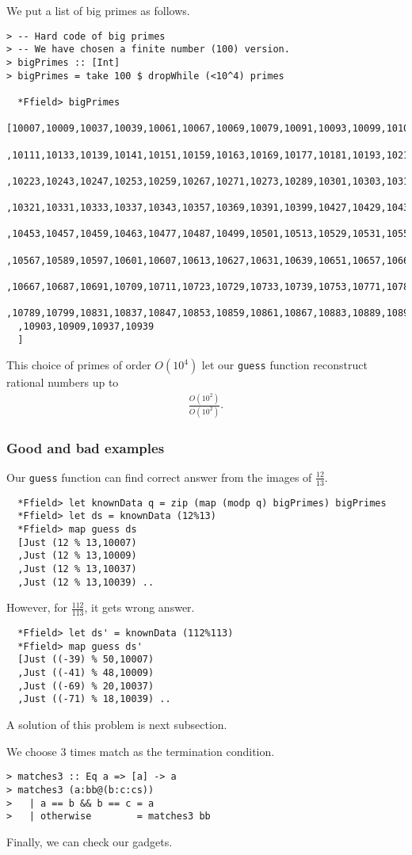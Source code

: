 \documentclass[11pt]{book}
\begin{document}
We put a list of big primes as follows.
\begin{verbatim}
> -- Hard code of big primes
> -- We have chosen a finite number (100) version.
> bigPrimes :: [Int]
> bigPrimes = take 100 $ dropWhile (<10^4) primes

  *Ffield> bigPrimes 
  [10007,10009,10037,10039,10061,10067,10069,10079,10091,10093,10099,10103
  ,10111,10133,10139,10141,10151,10159,10163,10169,10177,10181,10193,10211
  ,10223,10243,10247,10253,10259,10267,10271,10273,10289,10301,10303,10313
  ,10321,10331,10333,10337,10343,10357,10369,10391,10399,10427,10429,10433
  ,10453,10457,10459,10463,10477,10487,10499,10501,10513,10529,10531,10559
  ,10567,10589,10597,10601,10607,10613,10627,10631,10639,10651,10657,10663
  ,10667,10687,10691,10709,10711,10723,10729,10733,10739,10753,10771,10781
  ,10789,10799,10831,10837,10847,10853,10859,10861,10867,10883,10889,10891
  ,10903,10909,10937,10939
  ]
\end{verbatim}
This choice of primes of order $O(10^4)$ let our \verb+guess+ function reconstruct rational numbers up to
\begin{eqnarray}
\frac{O(10^2)}{O(10^2)}.
\end{eqnarray}

\subsubsection{Good and bad examples}
Our \verb+guess+ function can find correct answer from the images of $\frac{12}{13}$.
\begin{verbatim}
  *Ffield> let knownData q = zip (map (modp q) bigPrimes) bigPrimes
  *Ffield> let ds = knownData (12%13)
  *Ffield> map guess ds
  [Just (12 % 13,10007)
  ,Just (12 % 13,10009)
  ,Just (12 % 13,10037)
  ,Just (12 % 13,10039) ..
\end{verbatim}
However, for $\frac{112}{113}$, it gets wrong answer.
\begin{verbatim}
  *Ffield> let ds' = knownData (112%113)
  *Ffield> map guess ds'
  [Just ((-39) % 50,10007)
  ,Just ((-41) % 48,10009)
  ,Just ((-69) % 20,10037)
  ,Just ((-71) % 18,10039) ..
\end{verbatim}

A solution of this problem is next subsection.


We choose 3 times match as the termination condition.
\begin{verbatim}
> matches3 :: Eq a => [a] -> a
> matches3 (a:bb@(b:c:cs))
>   | a == b && b == c = a
>   | otherwise        = matches3 bb
\end{verbatim}
Finally, we can check our gadgets.
\end{document}
